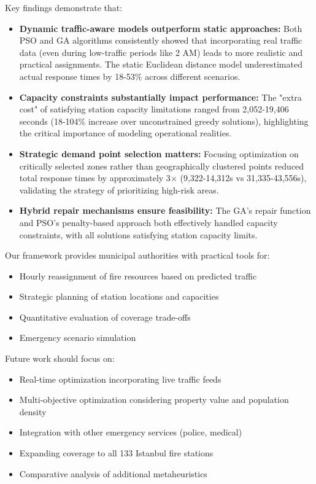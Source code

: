 \documentclass[conference]{IEEEtran}
\begin{document}
Key findings demonstrate that:
\begin{itemize}
    \item \textbf{Dynamic traffic-aware models outperform static approaches:} Both PSO and GA algorithms consistently showed that incorporating real traffic data (even during low-traffic periods like 2 AM) leads to more realistic and practical assignments. The static Euclidean distance model underestimated actual response times by 18-53\% across different scenarios.
    
    \item \textbf{Capacity constraints substantially impact performance:} The "extra cost" of satisfying station capacity limitations ranged from 2,052-19,406 seconds (18-104\% increase over unconstrained greedy solutions), highlighting the critical importance of modeling operational realities.
    
    \item \textbf{Strategic demand point selection matters:} Focusing optimization on critically selected zones rather than geographically clustered points reduced total response times by approximately 3$\times$ (9,322-14,312s vs 31,335-43,556s), validating the strategy of prioritizing high-risk areas.
    
    \item \textbf{Hybrid repair mechanisms ensure feasibility:} The GA's repair function and PSO's penalty-based approach both effectively handled capacity constraints, with all solutions satisfying station capacity limits.
\end{itemize}

Our framework provides municipal authorities with practical tools for:
\begin{itemize}
    \item Hourly reassignment of fire resources based on predicted traffic
    \item Strategic planning of station locations and capacities
    \item Quantitative evaluation of coverage trade-offs
    \item Emergency scenario simulation
\end{itemize}

Future work should focus on:
\begin{itemize}
    \item Real-time optimization incorporating live traffic feeds
    \item Multi-objective optimization considering property value and population density
    \item Integration with other emergency services (police, medical)
    \item Expanding coverage to all 133 Istanbul fire stations
    \item Comparative analysis of additional metaheuristics
\end{itemize}
\end{document}
